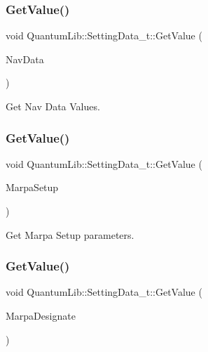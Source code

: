\subsubsection{\texorpdfstring{Get\+Value()}{GetValue()}\hspace{0.1cm}{\footnotesize\ttfamily [23/26]}}
{\footnotesize\ttfamily void Quantum\+Lib\+::\+Setting\+Data\+\_\+t\+::\+Get\+Value (\begin{DoxyParamCaption}\item[{\mbox{\hyperlink{struct_quantum_lib_1_1_nav_data__t}{Nav\+Data\+\_\+t}} \&}]{Nav\+Data }\end{DoxyParamCaption})\hspace{0.3cm}{\ttfamily [inline]}}



Get Nav Data Values. 

\mbox{\label{struct_quantum_lib_1_1_setting_data__t_a1c5c478c6e7d54c936a44d0c60c911fc}} 
\subsubsection{\texorpdfstring{Get\+Value()}{GetValue()}\hspace{0.1cm}{\footnotesize\ttfamily [24/26]}}
{\footnotesize\ttfamily void Quantum\+Lib\+::\+Setting\+Data\+\_\+t\+::\+Get\+Value (\begin{DoxyParamCaption}\item[{\mbox{\hyperlink{struct_quantum_lib_1_1_marpa_setup__t}{Marpa\+Setup\+\_\+t}} \&}]{Marpa\+Setup }\end{DoxyParamCaption})\hspace{0.3cm}{\ttfamily [inline]}}



Get Marpa Setup parameters. 

\mbox{\label{struct_quantum_lib_1_1_setting_data__t_aba02eca98fe521b09aab9d64de121bd0}} 
\subsubsection{\texorpdfstring{Get\+Value()}{GetValue()}\hspace{0.1cm}{\footnotesize\ttfamily [25/26]}}
{\footnotesize\ttfamily void Quantum\+Lib\+::\+Setting\+Data\+\_\+t\+::\+Get\+Value (\begin{DoxyParamCaption}\item[{\mbox{\hyperlink{struct_quantum_lib_1_1_marpa_designate__t}{Marpa\+Designate\+\_\+t}} \&}]{Marpa\+Designate }\end{DoxyParamCaption})\hspace{0.3cm}{\ttfamily [inline]}}



